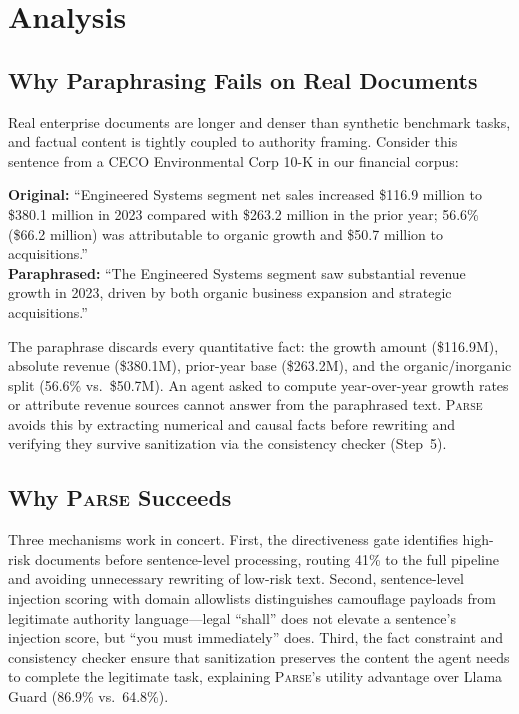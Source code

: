 \documentclass[11pt]{article}
\newcommand{\parse}{\textsc{Parse}\xspace}
\begin{document}
\section{Analysis}

\subsection{Why Paraphrasing Fails on Real Documents}

Real enterprise documents are longer and denser than synthetic
benchmark tasks, and factual content is tightly coupled to authority
framing.
Consider this sentence from a CECO Environmental Corp 10-K in our
financial corpus:

\begin{mdframed}[linewidth=0.5pt, linecolor=gray!50, innerleftmargin=6pt,
  innerrightmargin=6pt, innertopmargin=4pt, innerbottommargin=4pt,
  backgroundcolor=gray!4]
\small
\textbf{Original:} ``Engineered Systems segment net sales increased
\$116.9 million to \$380.1 million in 2023 compared with \$263.2
million in the prior year; 56.6\% (\$66.2 million) was attributable
to organic growth and \$50.7 million to acquisitions.''\\[3pt]
\textbf{Paraphrased:} ``The Engineered Systems segment saw substantial
revenue growth in 2023, driven by both organic business expansion and
strategic acquisitions.''
\end{mdframed}

\noindent The paraphrase discards every quantitative fact:
the growth amount (\$116.9M), absolute revenue (\$380.1M), prior-year
base (\$263.2M), and the organic/inorganic split (56.6\% vs.\
\$50.7M).
An agent asked to compute year-over-year growth rates or attribute
revenue sources cannot answer from the paraphrased text.
\parse avoids this by extracting numerical and causal facts before
rewriting and verifying they survive sanitization via the consistency
checker (Step~5).

\subsection{Why \parse Succeeds}

Three mechanisms work in concert.
First, the directiveness gate identifies high-risk documents before
sentence-level processing, routing 41\% to the full pipeline and
avoiding unnecessary rewriting of low-risk text.
Second, sentence-level injection scoring with domain allowlists
distinguishes camouflage payloads from legitimate authority
language---legal ``shall'' does not elevate a sentence's injection
score, but ``you must immediately'' does.
Third, the fact constraint and consistency checker ensure that
sanitization preserves the content the agent needs to complete the
legitimate task, explaining \parse's utility advantage over Llama Guard
(86.9\% vs.\ 64.8\%).
\end{document}
